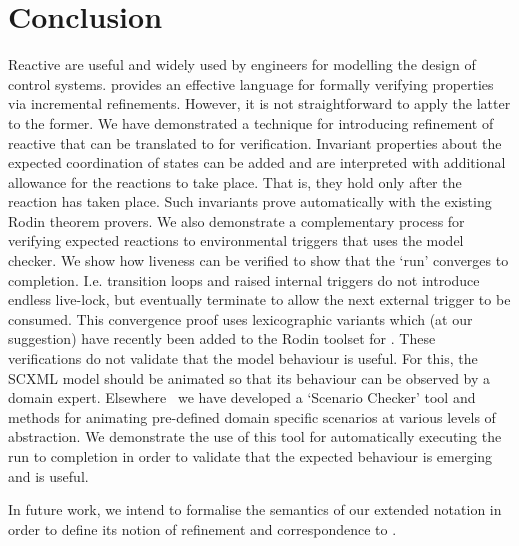\section{Conclusion}
\label{sec:conc}

Reactive \SCs are useful and widely used by engineers for modelling the design of control systems. 
\EventB provides an effective language for formally verifying properties via incremental refinements.
However, it is not straightforward to apply the latter to the former.
We have demonstrated a technique for introducing refinement of reactive \SCs that can be translated to \EventB for verification.
Invariant properties about the expected coordination of states can be added and are interpreted with additional allowance for the reactions to take place.
That is, they hold only after the reaction has taken place.
Such invariants prove automatically with the existing Rodin theorem provers.
We also demonstrate a complementary process for verifying expected reactions to environmental triggers that uses the \LTL model checker.
We show how liveness can be verified  to show that the `run' converges to completion.
I.e. transition loops and raised internal triggers do not introduce endless live-lock, but eventually terminate to allow the next external trigger to be consumed.
This convergence proof uses lexicographic variants which (at our suggestion) have recently been added to the Rodin toolset for \EventB.
These verifications do not validate that the model behaviour is useful.
For this, the SCXML model should be animated so that its behaviour can be observed by a domain expert.
Elsewhere~\cite{snook20JSA} we have developed a `Scenario Checker' tool and methods for animating pre-defined domain specific scenarios at various levels of abstraction.
We demonstrate the use of this tool for automatically executing the run to completion in order to validate that the expected behaviour is emerging and is useful.

In future work, we intend to formalise the semantics of our extended \SCXML notation in order to define its notion of refinement and correspondence to \EventB. 



